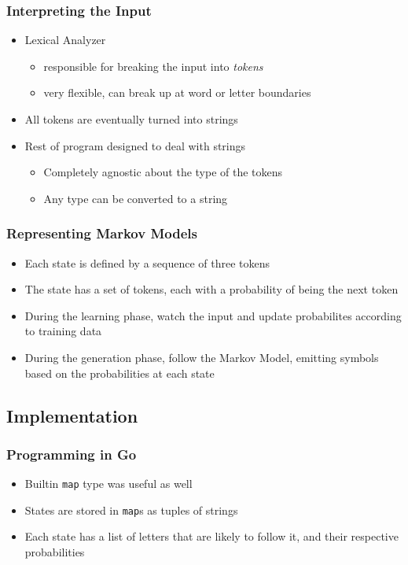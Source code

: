 \documentclass{beamer}
\begin{document}
\begin{frame}
   \frametitle{Interpreting the Input}
   \begin{itemize}
      \item Lexical Analyzer
      \begin{itemize}
         \item responsible for breaking the input into \emph{tokens}
         \item very flexible, can break up at word or letter boundaries
      \end{itemize}
      \item All tokens are eventually turned into strings
      \item Rest of program designed to deal with strings
      \begin{itemize}
         \item Completely agnostic about the type of the tokens
         \item Any type can be converted to a string
      \end{itemize}
   \end{itemize}
\end{frame}

\begin{frame}
   \frametitle{Representing Markov Models}
   \begin{itemize}
      \item Each state is defined by a sequence of three tokens
      \item The state has a set of tokens, each with a probability of being the
      next token
      \item During the learning phase, watch the input and update probabilites
      according to training data
      \item During the generation phase, follow the Markov Model, emitting
      symbols based on the probabilities at each state
   \end{itemize}
\end{frame}

\subsection{Implementation}

\begin{frame}
   \frametitle{Programming in Go}
   \begin{itemize}
      \item Builtin \texttt{map} type was useful as well
      \item States are stored in \texttt{map}s as tuples of strings
      \item Each state has a list of letters that are likely to follow it, and
      their respective probabilities
   \end{itemize}
\end{frame}
\end{document}
